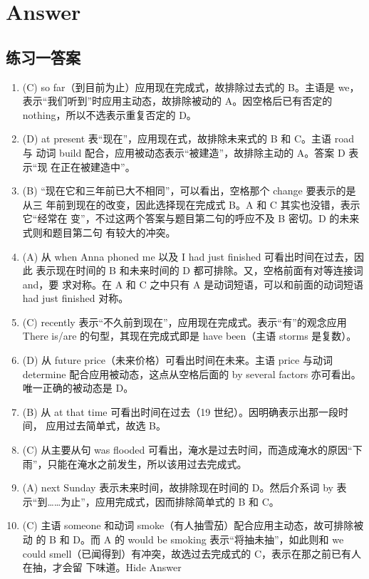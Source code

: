 \documentclass{yufa}
\begin{document}
\section{Answer}

\subsection{练习一答案}

\begin{enumerate}
\item (C) so far（到目前为止）应用现在完成式，故排除过去式的 B。主语是 we，表示“我们听到”时应用主动态，故排除被动的 A。因空格后已有否定的 nothing，所以不选表示重复否定的 D。

\item (D) at present 表“现在”，应用现在式，故排除未来式的 B 和 C。主语 road 与
  动词 build 配合，应用被动态表示“被建造”，故排除主动的 A。答案 D 表示“现
  在正在被建造中”。

\item (B) “现在它和三年前已大不相同”，可以看出，空格那个 change 要表示的是从三
  年前到现在的改变，因此选择现在完成式 B。A 和 C 其实也没错，表示它“经常在
  变”，不过这两个答案与题目第二句的呼应不及 B 密切。D 的未来式则和题目第二句
  有较大的冲突。

\item (A) 从 when Anna phoned me 以及 I had just finished 可看出时间在过去，因此
  表示现在时间的 B 和未来时间的 D 都可排除。又，空格前面有对等连接词 and，要
  求对称。在 A 和 C 之中只有 A 是动词短语，可以和前面的动词短语 had just
  finished 对称。

\item (C) recently 表示“不久前到现在”，应用现在完成式。表示“有”的观念应用 There is/are 的句型，其现在完成式即是 have been（主语 storms 是复数）。

\item (D) 从 future price（未来价格）可看出时间在未来。主语 price 与动词 determine 配合应用被动态，这点从空格后面的 by several factors 亦可看出。唯一正确的被动态是 D。

\item (B) 从 at that time 可看出时间在过去（19 世纪）。因明确表示出那一段时间，
  应用过去简单式，故选 B。

\item (C) 从主要从句 was flooded 可看出，淹水是过去时间，而造成淹水的原因“下雨”，只能在淹水之前发生，所以该用过去完成式。

\item (A) next Sunday 表示未来时间，故排除现在时间的 D。然后介系词 by 表示“到……为止”，应用完成式，因而排除简单式的 B 和 C。

\item (C) 主语 someone 和动词 smoke（有人抽雪茄）配合应用主动态，故可排除被动
  的 B 和 D。而 A 的 would be smoking 表示“将抽未抽”，如此则和 we could
  smell（已闻得到）有冲突，故选过去完成式的 C，表示在那之前已有人在抽，才会留
  下味道。Hide Answer

\end{enumerate}
\end{document}
